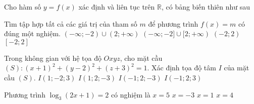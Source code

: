 \begin{ex}%
Cho hàm số $y=f(x)$ xác định và liên tục trên $\mathbb{R}$, có bảng biến thiên như sau
\begin{center}
\end{center}
Tìm tập hợp tất cả các giá trị của tham số $m$ để phương trình $f(x)=m$ có đúng một nghiệm.
\choice
{\True $(-\infty;-2)\cup (2;+\infty)$}
{$(-\infty;-2]\cup [2;+\infty)$}
{$(-2;2)$}
{$[-2;2]$}
\end{ex}

\begin{ex}%
Trong không gian với hệ tọa độ $Oxyz$, cho mặt cầu $(S)\colon (x+1)^2+(y-2)^2+(z+3)^2=1$. Xác định tọa độ tâm $I$ của mặt cầu $(S)$.
\choice
{$I(1;-2;3)$}
{$I(1;2;-3)$}
{\True $I(-1;2;-3)$}
{$I(-1;2;3)$}
\end{ex}

\begin{ex}%
Phương trình $\log_3(2x+1)=2$ có nghiệm là
\choice
{$x=5$}
{$x=-3$}
{$x=1$}
{\True $x=4$}
\end{ex}

